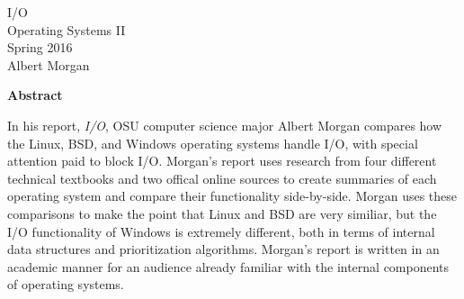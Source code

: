 \documentclass[10pt,journal,draftclsnofoot,onecolumn]{IEEEtran}
\begin{document}







\pagestyle{empty}
\vspace*{2in}
\begin{center}
\huge
I/O\\
\normalsize
Operating Systems II\\
Spring 2016\\
Albert Morgan
\end{center}
\vspace{.5in}
\begin{center}
\textbf{Abstract}
\end{center}
\begin{adjustwidth}{2in}{2in}
In his report, \textit{I/O}, OSU computer science major
Albert Morgan compares how the Linux, BSD, and Windows operating
systems handle I/O, with special attention paid to block I/O.
Morgan's report uses research from four different technical
textbooks and two offical online sources to create summaries of
each operating system and compare their functionality side-by-side.
Morgan uses these comparisons to make the point that Linux and BSD
are very similiar, but the I/O functionality of Windows is
extremely different, both in terms of internal data structures and
prioritization algorithms. Morgan's report is written in an
academic manner for an audience already familiar with the internal
components of operating systems.
\end{adjustwidth}
\newpage
\pagestyle{headings}
%
%
%
\end{document}
